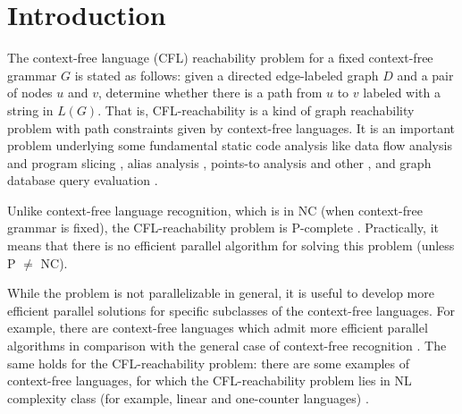 \documentclass{ws-ijfcs}
\begin{document}

\section{Introduction}
\label{intro}
The context-free language (CFL) reachability problem for a fixed context-free grammar $G$ is stated as follows: given a directed edge-labeled graph $D$ and a pair of nodes  $u$ and $v$, determine whether there is a path from $u$ to $v$ labeled with a string in $L(G)$.  That is, CFL-reachability is a kind of graph reachability problem with path constraints given by context-free languages. It is an important problem underlying some fundamental static code analysis like data flow analysis and program slicing \cite{RepsBasic}, alias analysis \cite*{Chatterjee, alias}, points-to analysis \cite{Incremental} and other \cite{Cai, android, typeflow}, and graph database query evaluation \cite{Azimov, GrigorevRagozina, HellingsCFPQ, RDF}.


Unlike context-free language recognition, which is in NC (when context-free grammar is fixed), the CFL-reachability problem is P-complete \cite{ RepSeq, Yannakakis}. Practically, it means that there is no efficient parallel algorithm for solving this problem (unless P $\neq$ NC). 


While the problem is not parallelizable in general, it is useful to develop more efficient parallel solutions for specific subclasses of the context-free languages. For example, there are context-free languages which admit more efficient parallel algorithms in comparison with the general case of context-free recognition \cite{IBARRA2, IBARRA, Okhotin2014ComplexityOI}.  The same holds for the CFL-reachability problem: there are some examples of context-free languages, for which the CFL-reachability problem lies in NL complexity class (for example, linear and one-counter languages) \cite{labelledGraphs, LReach, Regularrealizability}. 
\end{document}
